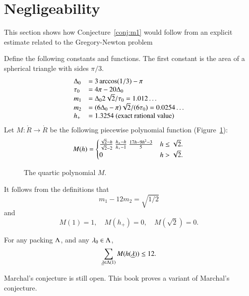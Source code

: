 \section{Negligeability}

This section shows how Conjecture~\ref{conj:m1} would follow from an explicit estimate
related to the Gregory-Newton problem


Define the following constants and functions.  The first constant
is the area of a spherical triangle with sides $\pi/3$.
$$
\begin{array}{lll}
\Delta_0 &= 3\arccos(1/3)-\pi\\
\tau_0 &= 4\pi - 20\Delta_0\\
m_1 &= \Delta_0 2\sqrt2/\tau_0 = 1.012\ldots \\ %
m_2  &= (6\Delta_0- \pi)\sqrt2/(6 \tau_0) = 0.0254\ldots\\ %
h_+ &= 1.3254 \hbox{~(exact rational value)}
\end{array}
$$
Let $M:\ring{R}\to\ring{R}$ 
be the following piecewise polynomial function (Figure~\ref{fig:M}):
$$
M(h) =
\begin{cases}
\frac{\sqrt2-h}{\sqrt2-2}~ \frac{h_+-h}{h_+-1} ~\frac{17 h - 9 h^2 - 3}{5} & h \le \sqrt2. \\
 0 & h >\sqrt2.
\end{cases}
\\
$$
\begin{figure}[htb]
  \centering
  \caption{The quartic polynomial $M$.}
  \label{fig:M}
\end{figure}

It follows from the definitions that
\begin{equation}\label{eqn:km}m_1 - 12m_2 = \sqrt{1/2}\end{equation}
and
\begin{equation}M(1) = 1,\quad M(h_+)=0,\quad M(\sqrt2) =0.\end{equation}


\begin{conjecture}[Marchal]\label{conj:m1} For any packing $\Lambda$, and
any $\lambda_0\in\Lambda$, 
$$
\sum_{{\underline{\lambda}}\in\Lambda(1)} M(h({\underline{\lambda}})) \le 12.
$$
\end{conjecture}

Marchal's conjecture is still open.  This book proves a variant of Marchal's conjecture.

